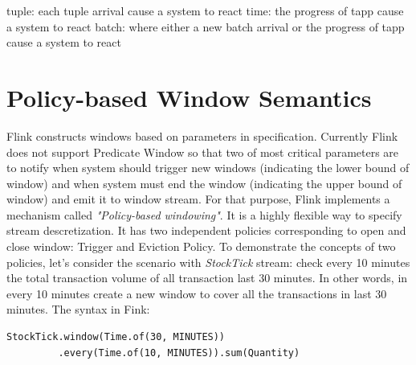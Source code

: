 tuple: each tuple arrival cause a system to react
time: the progress of tapp cause a system to react
batch:  where either a new batch arrival or the progress of tapp cause a system to react

\section{Policy-based Window Semantics}


Flink constructs windows based on parameters in specification. Currently Flink does not support Predicate Window so that two of most critical parameters are to notify when system should trigger new windows (indicating the lower bound of window) and when system must end the window (indicating the upper bound of window) and emit it to window stream. For that purpose, Flink implements a mechanism called \textit{"Policy-based windowing"}. It is a highly flexible way to specify stream descretization. It has two independent policies corresponding to open and close window: Trigger and Eviction Policy.
To demonstrate the concepts of two policies, let's consider the scenario with \textit{StockTick} stream: check every 10 minutes the total transaction volume of all transaction last 30 minutes. In other words, in every 10 minutes create a new window to cover all the transactions in last 30 minutes. The syntax in Fink:

\begin{verbatim}
StockTick.window(Time.of(30, MINUTES))
		 .every(Time.of(10, MINUTES)).sum(Quantity)
\end{verbatim}

